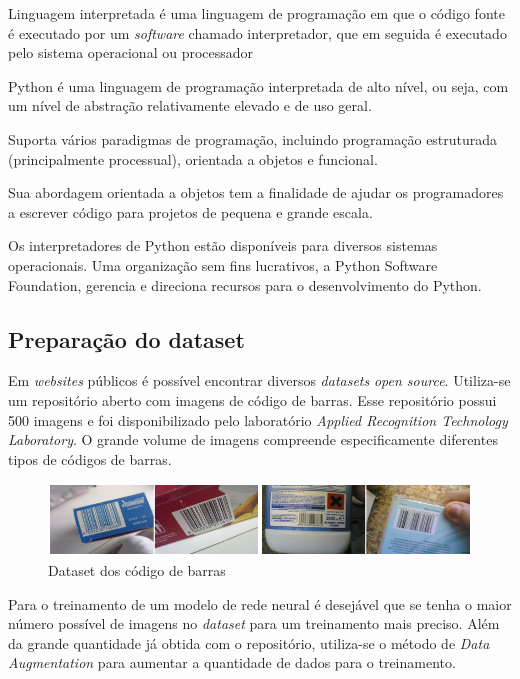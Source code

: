 Linguagem interpretada é uma linguagem de programação em que o código fonte é executado por um \textit{software} chamado interpretador, que em seguida é executado pelo sistema operacional ou processador

Python é uma linguagem de programação interpretada de alto nível, ou seja, com um nível de abstração relativamente elevado e de uso geral. 

Suporta vários paradigmas de programação, incluindo programação estruturada (principalmente processual), orientada a objetos e funcional.

Sua abordagem orientada a objetos tem a finalidade de ajudar os programadores a escrever código para projetos de pequena e grande escala.

Os interpretadores de Python estão disponíveis para diversos sistemas operacionais. Uma organização sem fins lucrativos, a Python Software Foundation, gerencia e direciona recursos para o desenvolvimento do Python. \cite{van2007python}


\subsection{Preparação do dataset}

Em \textit{websites} públicos é possível encontrar diversos \textit{datasets} \textit{open source}. Utiliza-se um repositório aberto com imagens de código de barras. Esse repositório possui 500 imagens e foi disponibilizado pelo laboratório \textit{Applied Recognition Technology Laboratory}. O grande volume de imagens compreende especificamente diferentes tipos de códigos de barras.\cite{Arte-Lab}

\begin{figure}[htbp]
	\centering
	\includegraphics[width=1\linewidth]{figuras/MachineLearning/barcodes.png}
	\caption{Dataset dos código de barras}
	\label{fig:datasetBarcode}
\end{figure}

Para o treinamento de um modelo de rede neural é desejável que se tenha o maior número possível de imagens no \textit{dataset} para um treinamento mais preciso. Além da grande quantidade já obtida com o repositório, utiliza-se o método de \textit{Data Augmentation} para aumentar a quantidade de dados para o treinamento.  

